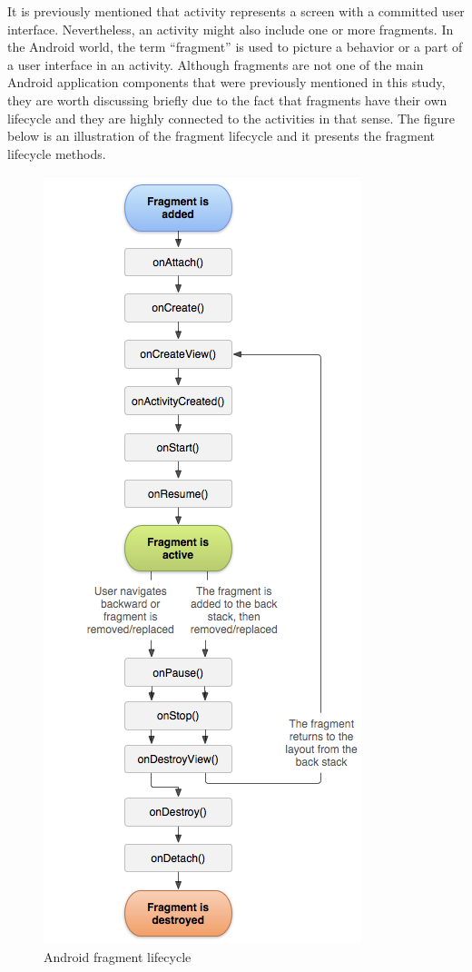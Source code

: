 It is previously mentioned that activity represents a screen with a committed user interface. Nevertheless, an activity might also include one or more fragments. In the Android world, the term “fragment” is used to picture a behavior or a part of a user interface in an activity. Although fragments are not one of the main Android application components that were previously mentioned in this study, they are worth discussing briefly due to the fact that fragments have their own lifecycle and they are highly connected to the activities in that sense. The figure below is an illustration of the fragment lifecycle and it presents the fragment lifecycle methods.
\begin{figure}[ht!]
    \centering
    \includegraphics[scale=0.4]{figures/fragment_life_cycle.png}
    \caption{Android fragment lifecycle \protect\footnotemark}
    \label{fig:android_fragment_life_cycle}
\end{figure}
